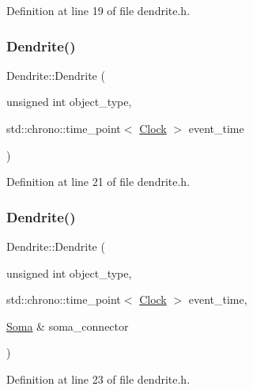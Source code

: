 Definition at line 19 of file dendrite.\+h.

\mbox{\label{class_dendrite_a10313257362c8f62c8b01a9992ec9ff7}} 
\subsubsection{\texorpdfstring{Dendrite()}{Dendrite()}\hspace{0.1cm}{\footnotesize\ttfamily [3/4]}}
{\footnotesize\ttfamily Dendrite\+::\+Dendrite (\begin{DoxyParamCaption}\item[{unsigned int}]{object\+\_\+type,  }\item[{std\+::chrono\+::time\+\_\+point$<$ \hyperlink{universe_8h_a0ef8d951d1ca5ab3cfaf7ab4c7a6fd80}{Clock} $>$}]{event\+\_\+time }\end{DoxyParamCaption})\hspace{0.3cm}{\ttfamily [inline]}}



Definition at line 21 of file dendrite.\+h.

\mbox{\label{class_dendrite_ac358d84fb75919386aced214fa0e1107}} 
\subsubsection{\texorpdfstring{Dendrite()}{Dendrite()}\hspace{0.1cm}{\footnotesize\ttfamily [4/4]}}
{\footnotesize\ttfamily Dendrite\+::\+Dendrite (\begin{DoxyParamCaption}\item[{unsigned int}]{object\+\_\+type,  }\item[{std\+::chrono\+::time\+\_\+point$<$ \hyperlink{universe_8h_a0ef8d951d1ca5ab3cfaf7ab4c7a6fd80}{Clock} $>$}]{event\+\_\+time,  }\item[{\hyperlink{class_soma}{Soma} \&}]{soma\+\_\+connector }\end{DoxyParamCaption})\hspace{0.3cm}{\ttfamily [inline]}}



Definition at line 23 of file dendrite.\+h.

